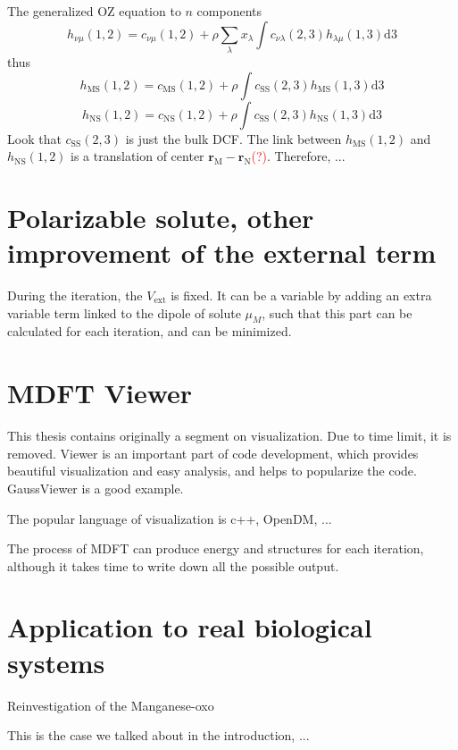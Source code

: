 The generalized \acs{OZ} equation to $n$ components
\begin{equation}
h_{\nu\mu}(1,2)=c_{\nu\mu}(1,2)+\rho\sum_{\lambda}x_{\lambda}\int c_{\nu\lambda}(2,3)h_{\lambda\mu}(1,3)\mathrm{d}3
\end{equation}
thus
\begin{equation}
h_{\text{MS}}(1,2)=c_{\text{MS}}(1,2)+\rho\int c_{\text{SS}}(2,3)h_{\text{MS}}(1,3)\mathrm{d}3
\end{equation}
\begin{equation}
h_{\text{NS}}(1,2)=c_{\text{NS}}(1,2)+\rho\int c_{\text{SS}}(2,3)h_{\text{NS}}(1,3)\mathrm{d}3
\end{equation}
Look that $c_{\text{SS}}(2,3)$ is just the bulk \acs{DCF}. The link
between $h_{\text{MS}}(1,2)$ and $h_{\text{NS}}(1,2)$ is a translation
of center $\mathbf{r}_{\text{M}}-\mathbf{r}_{\text{N}}$\textcolor{red}{(?)}.
Therefore, ...

\section{Polarizable solute, other improvement of the external term}

During the iteration, the $V_{\mathrm{ext}}$ is fixed. It can be
a variable by adding an extra variable term linked to the dipole of
solute $\mu_{M}$, such that this part can be calculated for each
iteration, and can be minimized.

\section{MDFT Viewer}

This thesis contains originally a segment on visualization. Due to
time limit, it is removed. Viewer is an important part of code development,
which provides beautiful visualization and easy analysis, and helps
to popularize the code. GaussViewer is a good example.

The popular language of visualization is c++, OpenDM, ...

The process of MDFT can produce energy and structures for each iteration,
although it takes time to write down all the possible output.

\section{Application to real biological systems}

Reinvestigation of the Manganese-oxo 

This is the case we talked about in the introduction, ...
